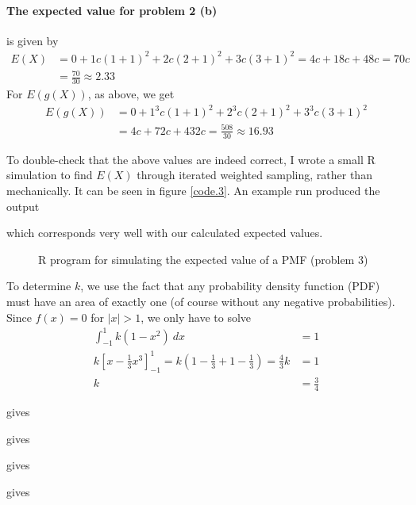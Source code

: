 \documentclass[a4paper,english,12pt]{article}
\begin{document}
\paragraph{The expected value for problem 2 (b)} is given by
\begin{align*}
  E(X) &=
    0 +
    1 c(1+1)^2 +
    2 c(2+1)^2 +
    3 c(3+1)^2 =
    4c + 18c + 48c = 70c \\
    &= \frac{70}{30} \approx 2.33
\end{align*}
For $E(g(X))$, as above, we get
\begin{align*}
  E(g(X)) &=
    0 +
    1^3 c(1+1)^2 +
    2^3 c(2+1)^2 +
    3^3 c(3+1)^2 \\
    &=  4c + 72c + 432c = \frac{508}{30} \approx 16.93
\end{align*}

To double-check that the above values are indeed correct, I wrote a small R
simulation to find $E(X)$ through iterated weighted sampling, rather than
mechanically. It can be seen in figure \vref{code.3}.
%
An example run produced the output

which corresponds very well with our calculated expected values.

\begin{figure}[t]
  
  \caption{R program for simulating the expected value of a PMF (problem 3)}
  \label{code.3}
\end{figure}



To determine $k$, we use the fact that any probability density function (PDF)
must have an area of exactly one (of course without any negative
probabilities). Since $f(x) = 0$ for $|x| > 1$, we only have to solve
\begin{align*}
  \int_{-1}^{1}{k(1-x^2)~dx} &= 1 \\
  k\left[ x - \frac{1}{3}{x^3} \right]_{-1}^{1} =
  k\left( 1 - \frac{1}{3} + 1 - \frac{1}{3} \right) = \frac{4}{3}k &= 1 \\
   k &= \frac{3}{4}
\end{align*}






\texttt{} gives
\texttt{}

\texttt{} gives
\texttt{}

 gives
\texttt{}

\texttt{} gives
\texttt{}

\end{document}
